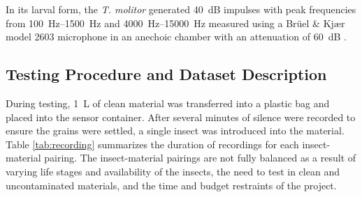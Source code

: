 \documentclass[../Vibro-Acoustic Signatures and Detection Algorithms for Stored Product Insects.tex]{subfiles}
\begin{document}
In its larval form, the \textit{T. molitor} generated \SI{40}{\deci\bel} impulses with peak frequencies from \SIrange{100}{1500}{\hertz} and \SIrange{4000}{15000}{\hertz} measured using a Br\"{u}el \& Kj\ae r model 2603 microphone in an anechoic chamber with an attenuation of \SI{60}{\deci\bel}
\cite{arnettMeasurementAdventitiousSounds1968}.

\newpage
\subsection{Testing Procedure and Dataset Description}

During testing, \SI{1}{\liter} of clean material was transferred into a plastic bag and placed into the sensor container. After several minutes of silence were recorded to ensure the grains were settled, a single insect was introduced into the material. Table \ref{tab:recording} summarizes the duration of recordings for each insect-material pairing. The insect-material pairings are not fully balanced as a result of varying life stages and availability of the insects, the need to test in clean and uncontaminated materials, and the time and budget restraints of the project.
\end{document}
